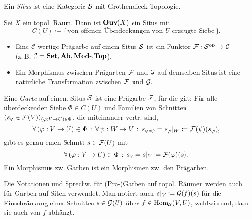 \documentclass{cheat-sheet}
\begin{document}

\begin{defn}
  Ein \emph{Situs} ist eine Kategorie $\mathcal{S}$ mit Grothendieck-Topologie.
\end{defn}

\begin{defn}
  Sei $X$ ein topol. Raum. Dann ist $\mathbf{Ouv}(X)$ ein Situs mit
  \[ C(U) \coloneqq \{ \, \text{von offenen Überdeckungen von $U$ erzeugte Siebe} \, \}. \]
\end{defn}

\begin{defn}
  \begin{itemize}
    \item Eine $\mathcal{C}$-wertige Prägarbe auf einem Situs $\mathcal{S}$ ist ein Funktor $\mathcal{F} : \mathcal{S}^{\mathrm{op}} \to \mathcal{C}$ \\
    (z.\,B. $\mathcal{C} = \mathbf{Set}, \mathbf{Ab}, \mathbf{Mod}\text{-}{,} \mathbf{Top}$).
    \item Ein Morphismus zwischen Prägarben $\mathcal{F}$ und $\mathcal{G}$ auf demselben Situs ist eine natürliche Transformation zwischen $\mathcal{F}$ und $\mathcal{G}$.
  \end{itemize}
\end{defn}

\begin{defn}
  Eine \emph{Garbe} auf einem Situs $\mathcal{S}$ ist eine Prägarbe $\mathcal{F}$, für die gilt:
  Für alle überdeckenden Siebe $\Phi \in C(U)$ und Familien von Schnitten $(s_\varphi \in \mathcal{F}(V))_{(\varphi : V \to U) \in \Phi}$, die miteinander vertr. sind, \dh{}
  \[ \forall \, {(\varphi : V \to U) \in \Phi} \,:\, \forall \, {\psi : W \to V} \,:\, s_{\varphi \circ \psi} = s_\varphi|_W \coloneqq \mathcal{F}(\psi)(s_\varphi), \]
  gibt es genau einen Schnitt $s \in \mathcal{F}(U)$ mit
  \[ \forall \, {(\varphi : V \to U) \in \Phi} \,:\, s_\varphi = s|_V \coloneqq \mathcal{F}(\varphi)(s). \]
  Ein Morphismus zw. Garben ist ein Morphismen zw. den Prägarben.
\end{defn}

\begin{bem}
  Die Notationen und Sprechw. für (Prä-)Garben auf topol. Räumen werden auch für Garben auf Siten verwendet.
  Man notiert auch $s|_V \coloneqq \mathcal{G}(f)(s)$ für die Einschränkung eines Schnittes $s \in \mathcal{G}(U)$ über $f \in \operatorname{Hom}_{\mathcal{S}}(V, U)$, wohlwissend, dass sie auch von $f$ abhängt.
\end{bem}
\end{document}
